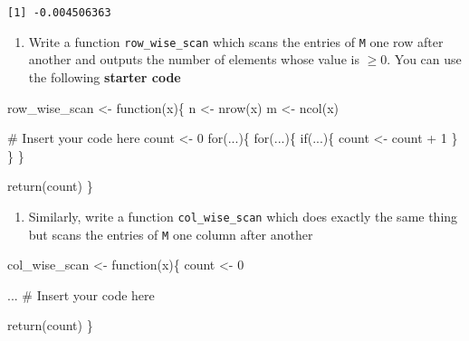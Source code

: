 \documentclass[
  letterpaper,
  DIV=11,
  numbers=noendperiod]{scrartcl}
\newenvironment{Shaded}{\begin{snugshade}}{\end{snugshade}}
\newcommand{\CommentTok}[1]{\textcolor[rgb]{0.37,0.37,0.37}{#1}}
\newcommand{\ControlFlowTok}[1]{\textcolor[rgb]{0.00,0.23,0.31}{#1}}
\newcommand{\DecValTok}[1]{\textcolor[rgb]{0.68,0.00,0.00}{#1}}
\newcommand{\FunctionTok}[1]{\textcolor[rgb]{0.28,0.35,0.67}{#1}}
\newcommand{\NormalTok}[1]{\textcolor[rgb]{0.00,0.23,0.31}{#1}}
\newcommand{\OtherTok}[1]{\textcolor[rgb]{0.00,0.23,0.31}{#1}}
\newcommand{\SpecialCharTok}[1]{\textcolor[rgb]{0.37,0.37,0.37}{#1}}
\providecommand{\tightlist}{%
  \setlength{\itemsep}{0pt}\setlength{\parskip}{0pt}}\usepackage{longtable,booktabs,array}
\begin{document}
\begin{verbatim}
[1] -0.004506363
\end{verbatim}

\begin{enumerate}
\def\labelenumi{\arabic{enumi}.}
\setcounter{enumi}{1}
\tightlist
\item
  Write a function \texttt{row\_wise\_scan} which scans the entries of
  \texttt{M} one row after another and outputs the number of elements
  whose value is \(\ge 0\). You can use the following \textbf{starter
  code}
\end{enumerate}

\begin{Shaded}
\begin{Highlighting}[]
\NormalTok{row\_wise\_scan }\OtherTok{\textless{}{-}} \ControlFlowTok{function}\NormalTok{(x)\{}
\NormalTok{    n }\OtherTok{\textless{}{-}} \FunctionTok{nrow}\NormalTok{(x)}
\NormalTok{    m }\OtherTok{\textless{}{-}} \FunctionTok{ncol}\NormalTok{(x)}

    \CommentTok{\# Insert your code here}
\NormalTok{    count }\OtherTok{\textless{}{-}} \DecValTok{0}
    \ControlFlowTok{for}\NormalTok{(...)\{}
        \ControlFlowTok{for}\NormalTok{(...)\{}
            \ControlFlowTok{if}\NormalTok{(...)\{}
\NormalTok{                count }\OtherTok{\textless{}{-}}\NormalTok{ count }\SpecialCharTok{+} \DecValTok{1} 
\NormalTok{            \}}
\NormalTok{        \}}
\NormalTok{    \}}

    \FunctionTok{return}\NormalTok{(count)}
\NormalTok{\}}
\end{Highlighting}
\end{Shaded}

\begin{enumerate}
\def\labelenumi{\arabic{enumi}.}
\setcounter{enumi}{2}
\tightlist
\item
  Similarly, write a function \texttt{col\_wise\_scan} which does
  exactly the same thing but scans the entries of \texttt{M} one column
  after another
\end{enumerate}

\begin{Shaded}
\begin{Highlighting}[]
\NormalTok{col\_wise\_scan }\OtherTok{\textless{}{-}} \ControlFlowTok{function}\NormalTok{(x)\{}
\NormalTok{    count }\OtherTok{\textless{}{-}} \DecValTok{0}
    
\NormalTok{    ... }\CommentTok{\# Insert your code here}

    \FunctionTok{return}\NormalTok{(count)}
\NormalTok{\}}
\end{Highlighting}
\end{Shaded}
\end{document}
